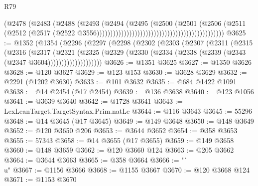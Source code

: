 \begin{lexlean}{R79}
\begin{coremodule}
                                                                        (@2478
                                                                          (@2483
                                                                            (@2488
                                                                              (@2493
                                                                                (@2494
                                                                                  (@2495
                                                                                    (@2500
                                                                                      (@2501
                                                                                        (@2506
                                                                                          (@2511
                                                                                            (@2512
                                                                                              (@2517
                                                                                                (@2522
                                                                                                  @3556)))))))))))))))))))))))))))))))))))))))))))))))
@3625 := @1352
    (@1354
      (@2296
        (@2297
          (@2298
            (@2302
              (@2303
                (@2307
                  (@2311
                    (@2315
                      (@2316
                        (@2317
                          (@2321
                            (@2325
                              (@2329
                                (@2330 (@2334 (@2338 (@2339 (@2343 (@2347 @3604))))))))))))))))))))
@3626 := @1351 @3625
@3627 := @1350 @3626
@3628 := @120 @3627
@3629 := @123 @153
@3630 := @3628 @3629
@3632 := @2291 (@1202 @3630)
@3633 := @101 @3632
@3635 := @684 @1422 @1091
@3638 := @14 @2454 (@17 @2454)
@3639 := @136 @3638
@3640 := @123 @1056
@3641 := @3639 @3640
@3642 := @1728 @3641
@3643 := LexLeanTarget.TargetSyntax.Prim.natLe
@3644 := @116 @3643
@3645 := 55296
@3648 := @14 @3645 (@17 @3645)
@3649 := @149 @3648
@3650 := @148 @3649
@3652 := @120 @3650 @206
@3653 := @3644 @3652
@3654 := @358 @3653
@3655 := 57343
@3658 := @14 @3655 (@17 @3655)
@3659 := @149 @3658
@3660 := @148 @3659
@3662 := @120 @3660 @124
@3663 := @205 @3662
@3664 := @3644 @3663
@3665 := @358 @3664
@3666 := "`\\u"
@3667 := @1156 @3666
@3668 := @1155 @3667
@3670 := @120 @3668 @124
@3671 := @1153 @3670

\end{coremodule}
\end{lexlean}
